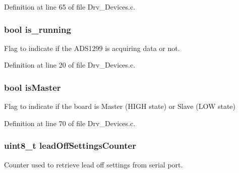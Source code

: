 Definition at line 65 of file Drv\+\_\+\+Devices.\+c.

\subsubsection[{\texorpdfstring{is\+\_\+running}{is_running}}]{\setlength{\rightskip}{0pt plus 5cm}bool is\+\_\+running}\hypertarget{group__Devices__Library_ga95cbd6b99430748422cc048b4f29dc52}{}\label{group__Devices__Library_ga95cbd6b99430748422cc048b4f29dc52}


Flag to indicate if the A\+D\+S1299 is acquiring data or not. 



Definition at line 20 of file Drv\+\_\+\+Devices.\+c.

\subsubsection[{\texorpdfstring{is\+Master}{isMaster}}]{\setlength{\rightskip}{0pt plus 5cm}bool is\+Master}\hypertarget{group__Devices__Library_ga6ceb9b5a0a67762763468c0ac71705fe}{}\label{group__Devices__Library_ga6ceb9b5a0a67762763468c0ac71705fe}


Flag to indicate if the board is Master (H\+I\+GH state) or Slave (L\+OW state) 



Definition at line 70 of file Drv\+\_\+\+Devices.\+c.

\subsubsection[{\texorpdfstring{lead\+Off\+Settings\+Counter}{leadOffSettingsCounter}}]{\setlength{\rightskip}{0pt plus 5cm}uint8\+\_\+t lead\+Off\+Settings\+Counter}\hypertarget{group__Devices__Library_gacaa36aec7dee3c3535b27afc88dcfc9c}{}\label{group__Devices__Library_gacaa36aec7dee3c3535b27afc88dcfc9c}


Counter used to retrieve lead off settings from serial port. 




